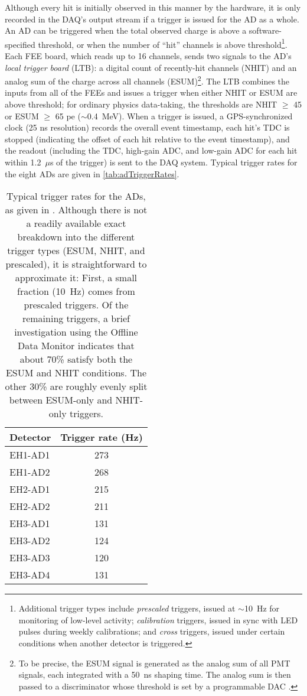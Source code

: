 \documentclass[../thesis.tex]{subfiles}
\begin{document}
Although every hit is initially observed in this manner by the hardware, it is only recorded in the DAQ's output stream if a trigger is issued for the AD as a whole. An AD can be triggered when the total observed charge is above a software-specified threshold, or when the number of ``hit'' channels is above threshold\footnote{Additional trigger types include \emph{prescaled} triggers, issued at $\sim$10~Hz for monitoring of low-level activity; \emph{calibration} triggers, issued in sync with LED pulses during weekly calibrations; and \emph{cross} triggers, issued under certain conditions when another detector is triggered.}. Each FEE board, which reads up to 16 channels, sends two signals to the AD's \emph{local trigger board} (LTB): a digital count of recently-hit channels (NHIT) and an analog sum of the charge across all channels (ESUM)\footnote{To be precise, the ESUM signal is generated as the analog sum of all PMT signals, each integrated with a 50~ns shaping time. The analog sum is then passed to a discriminator whose threshold is set by a programmable DAC \cite{TDR}.}. The LTB combines the inputs from all of the FEEs and issues a trigger when either NHIT or ESUM are above threshold; for ordinary physics data-taking, the thresholds are NHIT $\geq$ 45 or ESUM $\geq$ 65 pe ($\sim$0.4~MeV). When a trigger is issued, a GPS-synchronized clock (25 ns resolution) records the overall event timestamp, each hit's TDC is stopped (indicating the offset of each hit relative to the event timestamp), and the readout (including the TDC, high-gain ADC, and low-gain ADC for each hit within 1.2~$\mu$s of the trigger) is sent to the DAQ system. Typical trigger rates for the eight ADs are given in \autoref{tab:adTriggerRates}.

\begin{table}[h]
  \begin{tabular}{lc}
    \toprule
    Detector & Trigger rate (Hz) \\
    \midrule
    EH1-AD1 & 273 \\
    EH1-AD2 & 268 \\
    \midrule
    EH2-AD1 & 215 \\
    EH2-AD2 & 211 \\
    \midrule
    EH3-AD1 & 131 \\
    EH3-AD2 & 124 \\
    EH3-AD3 & 120 \\
    EH3-AD4 & 131 \\
    \bottomrule
  \end{tabular}
  \caption{Typical trigger rates for the ADs, as given in \cite{AN2016133}. Although there is not a readily available exact breakdown into the different trigger types (ESUM, NHIT, and prescaled), it is straightforward to approximate it: First, a small fraction (10~Hz) comes from prescaled triggers. Of the remaining triggers, a brief investigation using the Offline Data Monitor indicates that about 70\% satisfy both the ESUM and NHIT conditions. The other 30\% are roughly evenly split between ESUM-only and NHIT-only triggers.}
  \label{tab:adTriggerRates}
\end{table}
\end{document}
